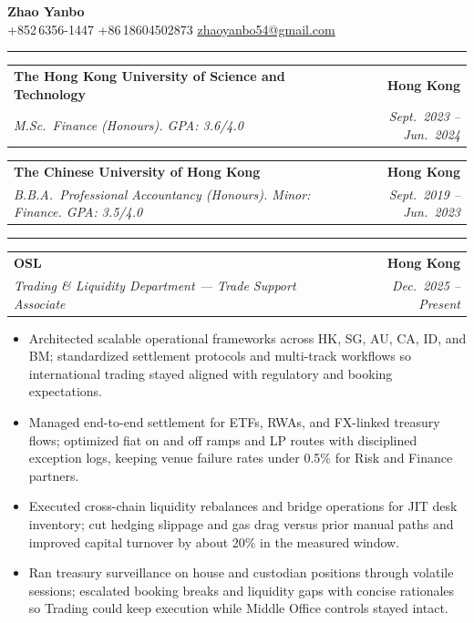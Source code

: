 \documentclass[9pt,a4paper]{extarticle}
\makeatletter
\newcommand{\ressection}[1]{%
  \vspace{0.8em}%
  \noindent{\large\scshape\bfseries #1}\par\nobreak
  \vspace{-\parskip}%
  \vspace{-\parskip}%
  \vspace{-\parskip}%
  \vspace{-\parskip}%
  \noindent\rule{\linewidth}{0.1pt}\par\nobreak
  \vspace{-\parskip}%
}
\newcommand{\resumeSubheading}[4]{%
  \vspace{0.6em}%
  \begin{tabular*}{\textwidth}{l@{\extracolsep{\fill}}r}
    \textbf{#1} & \textbf{#2} \\
    \textit{\small #3} & \textit{\small #4} \\
  \end{tabular*}\vspace{0.32em}}
\makeatother
\begin{document}
\begin{center}
  {\LARGE\bfseries Zhao Yanbo}\\[0.35em]
  \small
  +852\,6356-1447 \;\textbar\;
  +86\,18604502873 \;\textbar\;
  \href{mailto:zhaoyanbo54@gmail.com}{zhaoyanbo54@gmail.com}
\end{center}
\vspace{-0.2em}

\ressection{Education}

\resumeSubheading{The Hong Kong University of Science and Technology}{Hong Kong}{M.Sc.\ Finance (Honours). GPA: 3.6/4.0}{Sept.\ 2023 -- Jun.\ 2024}

\resumeSubheading{The Chinese University of Hong Kong}{Hong Kong}{B.B.A.\ Professional Accountancy (Honours). Minor: Finance. GPA: 3.5/4.0}{Sept.\ 2019 -- Jun.\ 2023}

\ressection{Work Experience}

\resumeSubheading{OSL}{Hong Kong}{Trading \& Liquidity Department --- Trade Support Associate}{Dec.\ 2025 -- Present}
\begin{itemize}
  \item Architected scalable operational frameworks across HK, SG, AU, CA, ID, and BM; standardized settlement protocols and multi-track workflows so international trading stayed aligned with regulatory and booking expectations.
  \item Managed end-to-end settlement for ETFs, RWAs, and FX-linked treasury flows; optimized fiat on and off ramps and LP routes with disciplined exception logs, keeping venue failure rates under 0.5\% for Risk and Finance partners.
  \item Executed cross-chain liquidity rebalances and bridge operations for JIT desk inventory; cut hedging slippage and gas drag versus prior manual paths and improved capital turnover by about 20\% in the measured window.
  \item Ran treasury surveillance on house and custodian positions through volatile sessions; escalated booking breaks and liquidity gaps with concise rationales so Trading could keep execution while Middle Office controls stayed intact.
\end{itemize}
\end{document}
